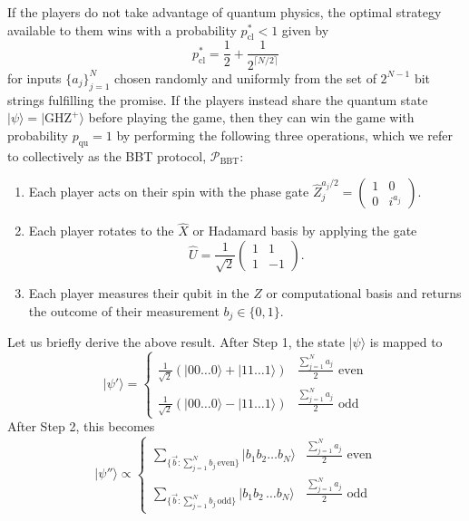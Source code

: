 \documentclass[prb,twocolumn,showpacs,amssymb,superscriptaddress]{revtex4-2}
\begin{document}
If the players do not take advantage of quantum physics, the optimal strategy available to them wins with a probability $p_{\mathrm{cl}}^*<1$ given by\cite{brassard2005recasting}
\begin{equation}
\label{eq:classwinprob}
p_{\mathrm{cl}}^* = \frac{1}{2} + \frac{1}{2^{\lceil N/2\rceil}}
\end{equation}
for inputs $\{a_j\}_{j=1}^N$ chosen randomly and uniformly from the set of $2^{N-1}$ bit strings fulfilling the promise. If the players instead share the quantum state $|\psi\rangle = |\mathrm{GHZ}^+\rangle$ before playing the game, then they can win the game with probability $p_{\mathrm{qu}} = 1$ by performing the following three operations, which we refer to collectively as the BBT protocol, $\mathcal{P}_{\mathrm{BBT}}$:
\begin{enumerate}
    \item Each player acts on their spin with the phase gate $\hat{Z}_j^{a_j/2} = \begin{pmatrix} 1 & 0 \\ 0 & i^{a_j} \end{pmatrix}$.
    \item Each player rotates to the $\hat{X}$ or Hadamard basis by applying the gate
    \begin{equation}
    \hat{U} = \frac{1}{\sqrt{2}} \begin{pmatrix} 1 & 1 \\ 1 & -1 \end{pmatrix}.
    \end{equation}
    \item Each player measures their qubit in the $\hat{Z}$ or computational basis and returns the outcome of their measurement $b_j \in \{0,1\}$.
\end{enumerate}
Let us briefly derive the above result. After Step 1, the state $|\psi\rangle$ is mapped to
\begin{equation}
|\psi'\rangle = \begin{cases} \frac{1}{\sqrt{2}}\left(| 00 \ldots 0\rangle + | 11 \ldots 1 \rangle\right) &  \frac{\sum_{j=1}^N a_j}{2}\,\, \mathrm{even} \\
\frac{1}{\sqrt{2}}\left(| 00 \ldots 0\rangle - | 11 \ldots 1\rangle\right) &  \frac{\sum_{j=1}^N a_j}{2} \,\, \mathrm{odd}
\end{cases}
\end{equation}
After Step 2, this becomes
\begin{equation}
|\psi''\rangle \propto \begin{cases} \sum_{\{\vec{b} : \sum_{j=1}^N b_j \, \mathrm{even}\}} |b_1 b_2 \ldots b_N \rangle & \frac{\sum_{j=1}^N a_j}{2}\,\, \mathrm{even} \\
\sum_{\{\vec{b} : \sum_{j=1}^N b_j \, \mathrm{odd}\}} |b_1 b_2 \, \ldots b_N \rangle & \frac{\sum_{j=1}^N a_j}{2}\,\, \mathrm{odd}
\end{cases}
\end{equation}
\end{document}
